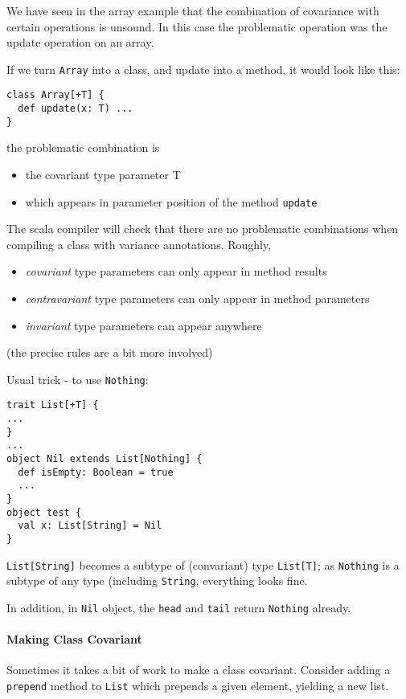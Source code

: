 \documentclass{scrartcl}
\begin{document}
We have seen in the array example that the combination of covariance with
certain operations is unsound. In this case the problematic operation was the
update operation on an array.

If we turn \lstinline|Array| into a class, and update into a method, it would
look like this:
\begin{lstlisting}
class Array[+T] {
  def update(x: T) ...
}
\end{lstlisting}
the problematic combination is
\begin{itemize}
\item the covariant type parameter T
\item which appears in parameter position of the method \lstinline|update|
\end{itemize}

The scala compiler will check that there are no problematic combinations when
compiling a class with variance annotations. Roughly,
\begin{itemize}
\item {\it covariant} type parameters can only appear in method results
\item {\it contravariant} type parameters can only appear in method parameters
\item {\it invariant} type parameters can appear anywhere
\end{itemize}
(the precise rules are a bit more involved)

Usual trick - to use \lstinline|Nothing|:
\begin{lstlisting}
trait List[+T] {
...
}
...
object Nil extends List[Nothing] {
  def isEmpty: Boolean = true
  ...
}
object test {
  val x: List[String] = Nil
}
\end{lstlisting}
\lstinline|List[String]| becomes a subtype of (convariant) type
\lstinline|List[T]|; as \lstinline|Nothing| is a subtype of any type (including
\lstinline|String|, everything looks fine.

In addition, in \lstinline|Nil| object, the \lstinline|head| and
\lstinline|tail| return \lstinline|Nothing| already.

\paragraph{Making Class Covariant}

Sometimes it takes a bit of work to make a class covariant. Consider adding a
\lstinline|prepend| method to \lstinline|List| which prepends a given element,
yielding a new list.
\end{document}
